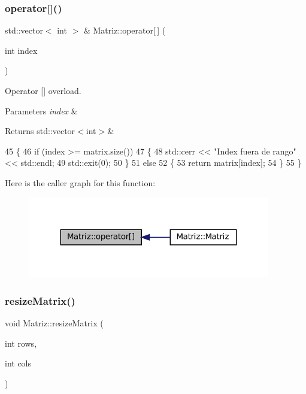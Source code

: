 \subsubsection{\texorpdfstring{operator[]()}{operator[]()}}
{\footnotesize\ttfamily std\+::vector$<$ int $>$ \& Matriz\+::operator\mbox{[}$\,$\mbox{]} (\begin{DoxyParamCaption}\item[{int}]{index }\end{DoxyParamCaption})}



Operator \mbox{[}\mbox{]} overload. 


\begin{DoxyParams}{Parameters}
{\em index} & \\
\hline
\end{DoxyParams}
\begin{DoxyReturn}{Returns}
std\+::vector$<$int$>$\& 
\end{DoxyReturn}

\begin{DoxyCode}
45 \{
46   \textcolor{keywordflow}{if} (index >= matrix.size())
47   \{
48     std::cerr << \textcolor{stringliteral}{"Index fuera de rango"} << std::endl;
49     std::exit(0);
50   \}
51   \textcolor{keywordflow}{else}
52   \{
53     \textcolor{keywordflow}{return} matrix[index];
54   \}
55 \}
\end{DoxyCode}
Here is the caller graph for this function\+:\nopagebreak
\begin{figure}[H]
\begin{center}
\leavevmode
\includegraphics[width=300pt]{classMatriz_ad2adc857ff1738ebfb7fe42de408737b_icgraph}
\end{center}
\end{figure}
\mbox{\label{classMatriz_aa929f933e9088dc0efecaa9a46d555d9}} 
\subsubsection{\texorpdfstring{resize\+Matrix()}{resizeMatrix()}}
{\footnotesize\ttfamily void Matriz\+::resize\+Matrix (\begin{DoxyParamCaption}\item[{int}]{rows,  }\item[{int}]{cols }\end{DoxyParamCaption})}



